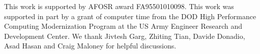 \documentclass[aps,prb,onecolumn,preprint,superscriptaddress,amsmath,amssymb,floatfix]{revtex4}
\newcommand{\kv}{\mspace{-4.0mu}\left(\mspace{-8.0mu}
\begin{smallmatrix}&\pmb{\kappa} \\&\nu\end{smallmatrix}
\mspace{-3.0mu}\right)}
\begin{document}
\begin{acknowledgements}
This work is supported by AFOSR award FA95501010098. 
This work was supported in part by a grant of computer time from the DOD 
High Performance Computing Modernization Program at the US Army Engineer 
Research and Development Center. 
We thank Jivtesh Garg, Zhiting Tian, Davide Donadio, 
Asad Hasan and Craig Maloney for helpful discussions.
\end{acknowledgements}

\appendix

% 
% 
% 
\end{document}
